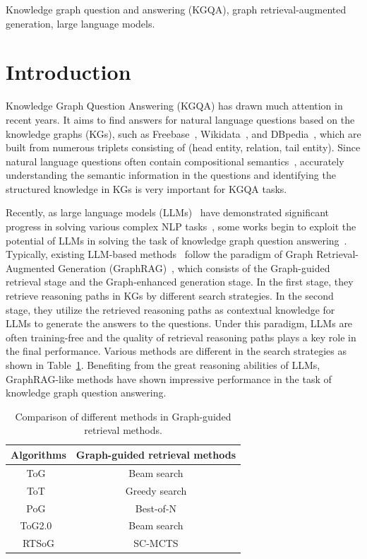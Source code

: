 \documentclass[lettersize,journal]{IEEEtran}
\begin{document}
\begin{IEEEkeywords}
Knowledge graph question and answering (KGQA), graph retrieval-augmented generation, large language models.
\end{IEEEkeywords}

\section{Introduction}
Knowledge Graph Question Answering (KGQA) has drawn much attention in recent years. It aims to find answers for natural language questions based on the knowledge graphs (KGs), such as Freebase~\cite{bollacker2008freebase}, Wikidata~\cite{vrandevcic2014wikidata}, and DBpedia~\cite{auer2007dbpedia}, which are built from numerous triplets consisting of (head entity, relation, tail entity). Since natural language questions often contain compositional semantics~\cite{lan2022complex}, accurately understanding the semantic information in the questions and identifying the structured knowledge in KGs is very important for KGQA tasks. 

Recently, as large language models (LLMs)~\cite{4o-mini, chatgpt, yang2024qwen2} have demonstrated significant progress in solving various complex NLP tasks~\cite{wei2022chain, yao2024tree}, some works begin to exploit the potential of LLMs in solving the task of knowledge graph question answering~\cite{markowitz2024tree, ma2024think}. Typically, existing LLM-based methods~\cite{chen2024plan, sun2023think} follow the paradigm of Graph Retrieval-Augmented Generation (GraphRAG)~\cite{peng2024graph}, which consists of the Graph-guided retrieval stage and the Graph-enhanced generation stage. In the first stage, they retrieve reasoning paths in KGs by different search strategies. In the second stage, they utilize the retrieved reasoning paths as contextual knowledge for LLMs to generate the answers to the questions. Under this paradigm, LLMs are often training-free and the quality of retrieval reasoning paths plays a key role in the final performance. Various methods are different in the search strategies as shown in Table~\ref{t1}. Benefiting from the great reasoning abilities of LLMs, GraphRAG-like methods have shown impressive performance in the task of knowledge graph question answering. 
\begin{table}[h]
\centering
\caption{Comparison of different methods in Graph-guided retrieval methods.}
\label{t1}
\begin{tabular}{cc}
\toprule
\textbf{Algorithms} & \textbf{Graph-guided retrieval methods} \\ \midrule
ToG~\cite{sun2023think}             & Beam search                                \\
ToT~\cite{markowitz2024tree}             & Greedy search                 \\
PoG~\cite{chen2024plan}             & Best-of-N                      \\
ToG2.0~\cite{ma2024think}          & Beam search                   \\ \midrule
RTSoG         & SC-MCTS                        \\ \bottomrule
\end{tabular}
\end{table}
\end{document}
